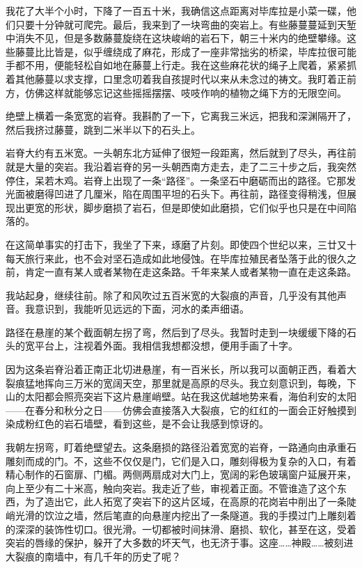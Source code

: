 \documentclass[AutoFakeBold=true]{book}
\begin{document}
我花了大半个小时，下降了一百五十米，我确信这点距离对毕库拉是小菜一碟，他们只要十分钟就可爬完。最后，我来到了一块弯曲的突岩上。有些藤蔓蔓延到天堑中消失不见，但是多数藤蔓旋绕在这块峻峭的岩石下，朝三十米内的绝壁攀缘。这些藤蔓比比皆是，似乎缠绕成了麻花，形成了一座非常拙劣的桥梁，毕库拉很可能手都不用，便能轻松自如地在藤蔓上行走。我在这些麻花状的绳子上爬着，紧紧抓着其他藤蔓以求支撑，口里念叨着我自孩提时代以来从未念过的祷文。我盯着正前方，仿佛这样就能够忘记这些摇摇摆摆、吱吱作响的植物之绳下方的无限空间。

绝壁上横着一条宽宽的岩脊。我斟酌了一下，它离我三米远，把我和深渊隔开了，然后我挤过藤蔓，跳到二米半以下的石头上。

岩脊大约有五米宽。一头朝东北方延伸了很短一段距离，然后就到了尽头，再往前就是大量的突岩。我沿着岩脊的另一头朝西南方走去，走了二三十步之后，我突然停住，呆若木鸡。岩脊上出现了一条``路径''。一条坚石中磨砺而出的路径。它那发光面被磨得凹进了几厘米，陷在周围平坦的石头下。再往前，路径变得稍浅，但展现出更宽的形状，脚步磨损了岩石，但是即使如此磨损，它们似乎也只是在中间陷落的。

在这简单事实的打击下，我坐了下来，琢磨了片刻。即使四个世纪以来，三廿又十每天旅行来此，也不会对坚石造成如此地侵蚀。在毕库拉殖民者坠落于此的很久之前，肯定一直有某人或者某物在走这条路。千年来某人或者某物一直在走这条路。

我站起身，继续往前。除了和风吹过五百米宽的大裂痕的声音，几乎没有其他声音。我意识到，我能听见远远的下面，河水的柔声细语。

路径在悬崖的某个截面朝左拐了弯，然后到了尽头。我暂时走到一块缓缓下降的石头的宽平台上，注视着外面。我相信我想都没想，便用手画了十字。

因为这条岩脊沿着正南正北切进悬崖，有一百米长，所以我可以面朝正西，看着大裂痕猛地挥向三万米的宽阔天空，那里就是高原的尽头。我立刻意识到，每晚，下山的太阳都会照亮突岩下这片悬崖峭壁。站在我这优越地势来看，海伯利安的太阳——在春分和秋分之日——仿佛会直接落入大裂痕，它的红红的一面会正好触摸到染成粉红色的岩石墙壁，看到这些，是不会让我感到惊讶的。

我朝左拐弯，盯着绝壁望去。这条磨损的路径沿着宽宽的岩脊，一路通向由承重石雕刻而成的门。不，这些不仅仅是门，它们是入口，雕刻得极为复杂的入口，有着精心制作的石窗扉、门楣。两侧两扇成对大门上，宽阔的彩色玻璃窗户延展开来，向上至少有二十米高，触向突岩。我走近了些，审视着正面。不管谁造了这个东西，为了造出它，此人拓宽了突岩下的这片区域，在高原的花岗岩中削出了一条陡峭光滑的饮泣之墙，然后笔直的向悬崖内挖出了一条隧道。我的手摸过门上雕刻着的深深的装饰性切口。很光滑。一切都被时间抹滑、磨损、软化，甚至在这，受着突岩的唇缘的保护，躲开了大多数的坏天气，也无济于事。这座……神殿……被刻进大裂痕的南墙中，有几千年的历史了呢？
\end{document}
